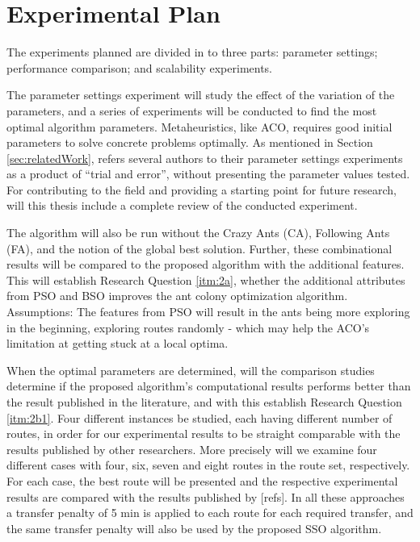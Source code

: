 \section{Experimental Plan}
\label{sec:expPlan}

The experiments planned are divided in to three parts: parameter settings; performance comparison; and scalability experiments.

The parameter settings experiment will study the effect of the variation of the parameters, and a series of experiments will be conducted to find the most optimal algorithm parameters. Metaheuristics, like ACO, requires good initial parameters to solve concrete problems optimally. As mentioned in Section \vref{sec:relatedWork}, refers several authors to their parameter settings experiments as a product of ``trial and error'', without presenting the parameter values tested. For contributing to the field and providing a starting point for future research, will this thesis include a complete review of the conducted experiment. %

The algorithm will also be run without the Crazy Ants (CA), Following Ants (FA), and the notion of the global best solution. Further, these combinational results will be compared to the proposed algorithm with the additional features. This will establish Research Question \vref{itm:2a}, whether the additional attributes from PSO and BSO improves the ant colony optimization algorithm. Assumptions: The features from PSO will result in the ants being more exploring in the beginning, exploring routes randomly - which may help the ACO's limitation at getting stuck at a local optima.

When the optimal parameters are determined, will the comparison studies determine if the proposed algorithm's computational results performs better than the result published in the literature, and with this establish Research Question \ref{itm:2b1}.%
Four different instances be studied, each having different number of routes, in order for our experimental results to be straight comparable with the results published by other researchers. More precisely will we examine four different cases with four, six, seven and eight routes in the route set, respectively. For each case, the best route will be presented and the respective experimental results are compared with the results published by [refs]. In all these approaches a transfer penalty of 5 min is applied to each route for each required transfer, and the same transfer penalty will also be used by the proposed SSO algorithm. 

